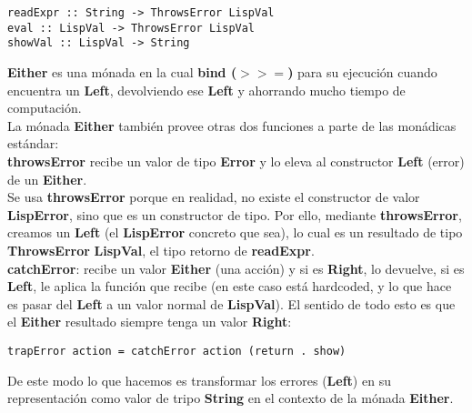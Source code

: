 \begin{minipage}{\linewidth}
\begin{small}
\begin{lstlisting}[frame=single]
readExpr :: String -> ThrowsError LispVal
eval :: LispVal -> ThrowsError LispVal
showVal :: LispVal -> String
\end{lstlisting}
\end{small}
\end{minipage}

\textbf{Either} es una m\'onada en la cual \textbf{bind ($>>=$)} para su ejecuci\'on cuando encuentra un \textbf{Left}, devolviendo ese \textbf{Left} y ahorrando mucho tiempo de computaci\'on.\\

La m\'onada \textbf{Either} tambi\'en provee otras dos funciones a parte de las mon\'adicas est\'andar:\\

\textbf{throwsError} recibe un valor de tipo \textbf{Error} y lo eleva al constructor \textbf{Left} (error) de un \textbf{Either}.\\

Se usa \textbf{throwsError} porque en realidad, no existe el constructor de valor \textbf{LispError}, sino que es un constructor de tipo. Por ello, mediante \textbf{throwsError}, creamos un \textbf{Left} (el \textbf{LispError} concreto que sea), lo cual es un resultado de tipo \textbf{ThrowsError} \textbf{LispVal}, el tipo retorno de \textbf{readExpr}.\\

\textbf{catchError}: recibe un valor \textbf{Either} (una acci\'on) y si es \textbf{Right}, lo devuelve, si es \textbf{Left}, le aplica la funci\'on que recibe (en este caso est\'a hardcoded, y lo que hace es pasar del \textbf{Left} a un valor normal de \textbf{LispVal}). El sentido de todo esto es que el \textbf{Either} resultado siempre tenga un valor \textbf{Right}:\\

\begin{minipage}{\linewidth}
\begin{small}
\begin{lstlisting}[frame=single]
trapError action = catchError action (return . show)
\end{lstlisting}
\end{small}
\end{minipage}

De este modo lo que hacemos es transformar los errores (\textbf{Left}) en su representaci\'on como valor de tripo \textbf{String} en el contexto de la m\'onada \textbf{Either}.\\

